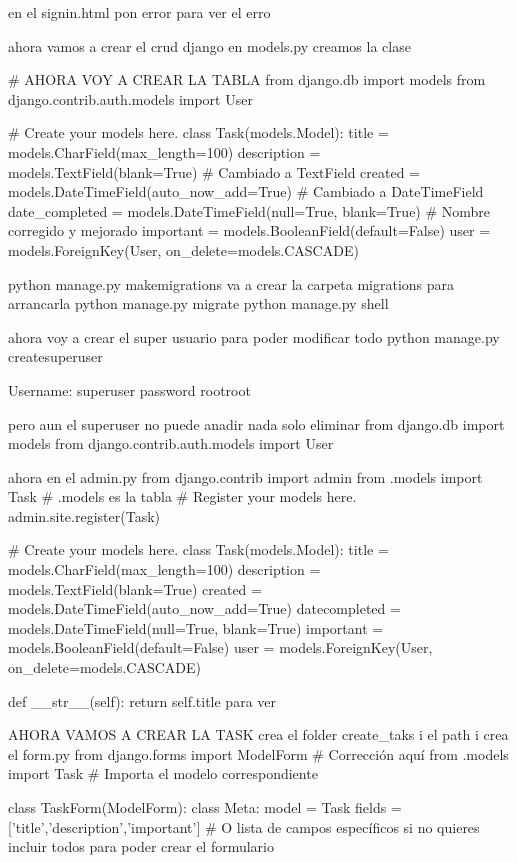 {{{{{{{{{{{{{{{en el signin.html pon {{error}} para ver el erro

ahora vamos a crear el crud django
en models.py  creamos la clase 


# AHORA VOY A CREAR LA TABLA 
from django.db import models
from django.contrib.auth.models import User

# Create your models here.
class Task(models.Model):
    title = models.CharField(max_length=100)
    description = models.TextField(blank=True)  # Cambiado a TextField
    created = models.DateTimeField(auto_now_add=True)  # Cambiado a DateTimeField
    date_completed = models.DateTimeField(null=True, blank=True)  # Nombre corregido y mejorado
    important = models.BooleanField(default=False)
    user = models.ForeignKey(User, on_delete=models.CASCADE)

    python manage.py makemigrations
  va a crear la carpeta migrations 
  para arrancarla python manage.py migrate
  python manage.py shell 

  ahora voy a crear el super usuario para poder modificar todo
  python manage.py createsuperuser

  Username: superuser
  password rootroot

  pero aun el superuser no puede anadir nada solo eliminar 
  from django.db import models
  from django.contrib.auth.models import User


   ahora en el admin.py 
   from django.contrib import admin
from .models import Task
# .models es la tabla
# Register your models here.
admin.site.register(Task)

      # Create your models here.
  class Task(models.Model):
      title = models.CharField(max_length=100)
      description = models.TextField(blank=True)  
      created = models.DateTimeField(auto_now_add=True)  
      datecompleted = models.DateTimeField(null=True, blank=True)  
      important = models.BooleanField(default=False)
      user = models.ForeignKey(User, on_delete=models.CASCADE)
      
      def __str__(self):
          return self.title
 para ver
 

 AHORA VAMOS A CREAR LA TASK 
    crea el folder create_taks i el path  i crea el form.py 
    from django.forms import ModelForm  # Corrección aquí
    from .models import Task  # Importa el modelo correspondiente
    
    class TaskForm(ModelForm):
        class Meta:
            model = Task
            fields = ['title','description','important']  # O lista de campos específicos si no quieres incluir todos
 para poder crear el formulario
 
}}}}}}}}}}}}}}}
